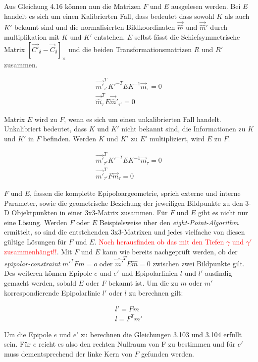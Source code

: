 Aus Gleichung 4.16 können nun die Matrizen $F$ und $E$ ausgelesen werden. Bei $E$ handelt es sich um einen Kalibrierten Fall, dass bedeutet dass sowohl $K$ als auch $K'$ bekannt sind und die normalisierten Bildkoordinaten $\vec{\hat{m}}$ und $\vec{\hat{m}}'$  durch multiplikation mit $K$ und $K'$ entstehen. $E$ selbst fässt die Schiefsymmetrische Matrix $[\vec{C'}_\delta - \vec{C}_\delta]_\times$ und die beiden Transformationsmatrizen $R$ und $R'$ zusammen. 

\begin{gather}
\vec{m'}_{\tau'}^T K'^{-T}EK^{-1}\vec{m}_\tau = 0\\
\vec{\hat{m}}_\tau^T E \vec{\hat{m}}'_{\tau'} = 0
\end{gather}

Matrix $E$ wird zu $F$, wenn es sich um einen unkalibrierten Fall handelt. Unkalibriert bedeutet, dass $K$ und $K'$ nicht bekannt sind, die Informationen zu $K$ und $K'$ in $F$ befinden. Werden $K$ und $K'$ zu $E'$ multipliziert, wird $E$ zu $F$. 

\begin{gather}
\vec{m'}_{\tau'}^T K'^{-T}EK^{-1}\vec{m}_\tau = 0\\
\vec{m'}_{\tau'}^T F\vec{m}_\tau = 0
\end{gather}

$F$ und $E$, fassen die komplette Epipoloargeometrie, sprich externe und interne Parameter, sowie die geometrische Beziehung der jeweiligen Bildpunkte zu den 3-D Objektpunkten in einer 3x3-Matrix zusammen. Für $F$ und $E$ gibt es nicht nur eine Lösung. Werden $F$ oder $E$ Beispielsweise über den \textit{eight-Point-Algorithm} ermittelt, so sind die entstehenden 3x3-Matrixen und jedes vielfache von diesen gültige Lösungen für $F$ und $E$\cite{HZ,HZ8}. \textcolor{red}{Noch herausfinden ob das mit den Tiefen $\gamma$ und $\gamma'$ zusammenhängt!!}. Mit $F$ und $E$ kann wie bereits nachgeprüft werden, ob der \textit{epipolar-constraint} $m'^TFm = o$ oder $\hat{m'}^TE\hat{m} = 0$ zwischen zwei Bildpunkte gilt. Des weiteren können Epipole $e$ und $e'$ und Epipolarlinien $l$ und $l'$ ausfindig gemacht werden, sobald $E$ oder $F$ bekannt ist\cite{HZ,Elements,HZ8,ZZGXr}. Um die zu $m$ oder $m'$ korrespondierende Epipolarlinie $l'$ oder $l$ zu berechnen gilt:

\begin{gather}
l' = Fm\\
l = F^Tm'
\end{gather} 

Um die Epipole $e$ und $e'$ zu berechnen die Gleichungen 3.103 und 3.104 erfüllt sein. Für $e$ reicht es also den rechten Nullraum von F zu bestimmen und für $e'$ muss dementsprechend der linke Kern von $F$ gefunden werden. 

